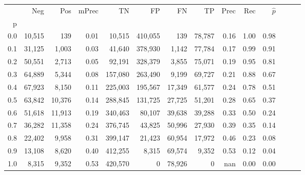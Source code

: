 \begin{tabular}{rrrrrrrrrrrrrr}
\toprule
{} &     Neg &     Pos & mPrec &       TN &       FP &      FN &      TP &  Prec &   Rec & $\hat{p}$ \\
p   &         &         &       &          &          &         &         &       &       &           \\
\midrule
0.0 &  10,515 &     139 &  0.01 &   10,515 &  410,055 &     139 &  78,787 &  0.16 &  1.00 &      0.98 \\
0.1 &  31,125 &   1,003 &  0.03 &   41,640 &  378,930 &   1,142 &  77,784 &  0.17 &  0.99 &      0.91 \\
0.2 &  50,551 &   2,713 &  0.05 &   92,191 &  328,379 &   3,855 &  75,071 &  0.19 &  0.95 &      0.81 \\
0.3 &  64,889 &   5,344 &  0.08 &  157,080 &  263,490 &   9,199 &  69,727 &  0.21 &  0.88 &      0.67 \\
0.4 &  67,923 &   8,150 &  0.11 &  225,003 &  195,567 &  17,349 &  61,577 &  0.24 &  0.78 &      0.51 \\
0.5 &  63,842 &  10,376 &  0.14 &  288,845 &  131,725 &  27,725 &  51,201 &  0.28 &  0.65 &      0.37 \\
0.6 &  51,618 &  11,913 &  0.19 &  340,463 &   80,107 &  39,638 &  39,288 &  0.33 &  0.50 &      0.24 \\
0.7 &  36,282 &  11,358 &  0.24 &  376,745 &   43,825 &  50,996 &  27,930 &  0.39 &  0.35 &      0.14 \\
0.8 &  22,402 &   9,958 &  0.31 &  399,147 &   21,423 &  60,954 &  17,972 &  0.46 &  0.23 &      0.08 \\
0.9 &  13,108 &   8,620 &  0.40 &  412,255 &    8,315 &  69,574 &   9,352 &  0.53 &  0.12 &      0.04 \\
1.0 &   8,315 &   9,352 &  0.53 &  420,570 &        0 &  78,926 &       0 &   nan &  0.00 &      0.00 \\
\bottomrule
\end{tabular}
